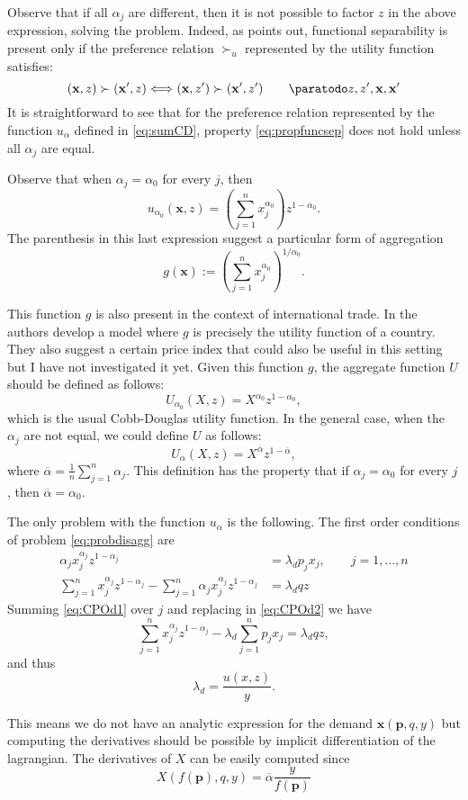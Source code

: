 \documentclass[english, a4paper,12pt]{article}
\begin{document}
Observe that if all $\alpha_{j}$ are different, then it is not possible to factor $z$ in the above expression, solving the problem. Indeed, as \cite{VarianBook} points out, functional separability is present only if the preference relation $\succ_{u}$ represented by the utility function satisfies:
	\begin{equation} \label{eq:propfuncsep}
		(\mathbf{x}, z) \succ (\mathbf{x'}, z) 
			\Longleftrightarrow (\mathbf{x}, z') \succ (\mathbf{x'}, z') \qquad \paratodo z, z', \mathbf{x}, \mathbf{x'}
	\end{equation}
It is straightforward to see that for the preference relation represented by the function $u_{\alpha}$ defined in \eqref{eq:sumCD}, property \eqref{eq:propfuncsep} does not hold unless all $\alpha_{j}$ are equal. 

Observe that when $\alpha_{j} = \alpha_{0}$ for every $j$, then
	$$u_{\alpha_{0}}(\mathbf{x},z) = \left(\sum_{j=1}^{n} x_{j}^{\alpha_{0}}\right)z^{1-\alpha_{0}}.$$
The parenthesis in this last expression suggest a particular form of aggregation
	$$g(\mathbf{x}) := \left(\sum_{j=1}^{n} x_{j}^{\alpha_{0}}\right)^{1/\alpha_{0}}.$$
	
This function $g$ is also present in the context of international trade. In \cite{TradeFlows} the authors develop a model where $g$ is precisely the utility function of a country. They also suggest a certain price index that could also be useful in this setting but I have not investigated it yet. Given this function $g$, the aggregate function $U$ should be defined as follows:
	$$U_{\alpha_{0}}(X, z) = X^{\alpha_{0}}z^{1-\alpha_{0}},$$
which is the usual Cobb-Douglas utility function. In the general case, when the $\alpha_{j}$ are not equal, we could define $U$ as follows:
	$$U_{\alpha}(X,z) = X^{\overline{\alpha}}z^{1-\overline{\alpha}},$$
where $\overline{\alpha} = \frac{1}{n}\sum_{j=1}^{n} \alpha_{j}$. This definition has the property that if $\alpha_{j} = \alpha_{0}$ for every $j$, then $\overline{\alpha} = \alpha_{0}$.

The only problem with the function $u_{\alpha}$ is the following. The first order conditions of problem \eqref{eq:probdisagg} are
	\begin{align}
		\alpha_{j}x_{j}^{\alpha_{j}}z^{1-\alpha_{j}}	&=	\lambda_{d}p_{j}x_{j},	\qquad j= 1,\ldots,n	\label{eq:CPOd1}	\\
		\sum_{j=1}^{n} x_{j}^{\alpha_{j}}z^{1-\alpha_{j}} - \sum_{j=1}^{n}\alpha_{j}x_{j}^{\alpha_{j}}z^{1-\alpha_{j}}
											&=	\lambda_{d}qz							\label{eq:CPOd2}
	\end{align}
Summing \eqref{eq:CPOd1} over $j$ and replacing in \eqref{eq:CPOd2} we have
	$$\sum_{j=1}^{n} x_{j}^{\alpha_{j}}z^{1-\alpha_{j}} - \lambda_{d} \sum_{j=1}^{n} p_{j}x_{j} = \lambda_{d}qz,$$
and thus
	$$\lambda_{d} = \frac{u(x,z)}{y}.$$

This means we do not have an analytic expression for the demand $\mathbf{x}(\mathbf{p}, q,y)$ but computing the derivatives should be possible by implicit differentiation of the lagrangian. The derivatives of $X$ can be easily computed since
	$$X(f(\mathbf{p}), q, y) = \overline{\alpha}\frac{y}{f(\mathbf{p})}$$



\end{document}
